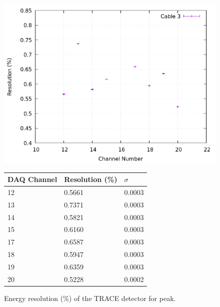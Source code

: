 \begin{figure}[h]
  \centering
  \begin{minipage}[b]{0.45\textwidth}
  \vspace{5mm}
    \includegraphics[width=\textwidth]{img/plot/pu/3_res_pu.png}
    \label{res:pu3}
  \end{minipage}
  \hfill
  \begin{minipage}[b]{0.45\textwidth}
  \begin{tabular}{lll}
    DAQ Channel & Resolution (\%) & $\sigma$ \\
    \midrule
    12 & \num{0.5661} & 0.0003 \\
    13 & \num{0.7371} & 0.0003 \\
    14 & \num{0.5821} & 0.0003 \\
    15 & \num{0.6160} & 0.0003 \\
    17 & \num{0.6587} & 0.0003 \\
    18 & \num{0.5947} & 0.0003 \\
    19 & \num{0.6359} & 0.0003 \\
    20 & \num{0.5228} & 0.0002 \\
    \bottomrule
  \end{tabular}
  \label{res:plot:pu3}
  \end{minipage}
  \caption{Energy resolution (\%) of the TRACE detector for  peak.}
  \label{res:pu}
\end{figure}

